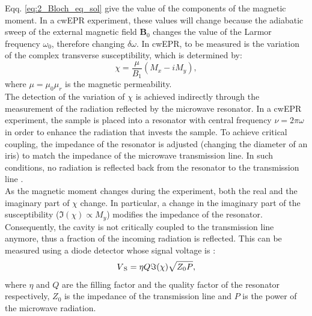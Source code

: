 \documentclass[a4paper]{book}
\newcommand{\tsub}{\textsubscript}
\newcommand{\mb}{\mathbf}
\begin{document}
	Eqq. \eqref{eq:2_Bloch_eq_sol} give the value of the components of the magnetic moment. In a cwEPR experiment, these values will change because the adiabatic sweep of the external magnetic field $\mb B_0$ changes the value of the Larmor frequency $\omega_0$, therefore changing $\delta \omega$. In cwEPR, to be measured is the variation of the complex transverse susceptibility, which is determined by:
	\begin{equation}
		\label{eq:2_complex_transverse_susceptibility}
		\chi = \frac{\mu}{B_1}(M_x - iM_y),
	\end{equation}
	where $\mu = \mu_0\mu_r$ is the magnetic permeability.\\
	The detection of the variation of $\chi$ is achieved indirectly through the measurement of the radiation reflected by the microwave resonator. In a cwEPR experiment, the sample is placed into a resonator with central frequency $\nu = 2\pi\omega$ in order to enhance the radiation that invests the sample. To achieve critical coupling, the impedance of the resonator is adjusted (changing the diameter of an iris) to match the impedance of the microwave transmission line. In such conditions, no radiation is reflected back from the resonator to the transmission line \cite{pooleElectronSpinResonance1967}.\\
	As the magnetic moment changes during the experiment, both the real and the imaginary part of $\chi$ change. 
	In particular, a change in the imaginary part of the susceptibility ($\Im(\chi)\propto M_y$) modifies the impedance of the resonator. Consequently, the cavity is not critically coupled to the transmission line anymore, thus a fraction of the incoming radiation is reflected. This can be measured using a diode detector whose signal voltage is \cite{feherSensitivityConsiderationsMicrowave1957}:
	\begin{equation}
		\label{eq:2_signal_voltage}
		V\tsub S = \eta Q\Im(\chi)\sqrt{Z_0P},
	\end{equation}
	where $\eta$ and $Q$ are the filling factor and the quality factor of the resonator respectively, $Z_0$ is the impedance of the transmission line and $P$ is the power of the microwave radiation.\\
	
\end{document}

